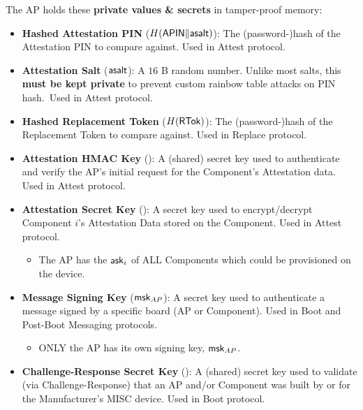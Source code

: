 \iflong
The AP holds these \textbf{private values \& secrets} in tamper-proof memory:
\begin{itemize}
    \item \textbf{Hashed Attestation PIN} ($H(\mathsf{APIN} \Vert \mathsf{asalt})$): The (password-)hash of the Attestation PIN to compare against. Used in Attest protocol.
    \item \textbf{Attestation Salt} ($\mathsf{asalt}$): A $16$ B random number. \iflong Unlike most salts, this \textbf{must be kept private} to prevent custom rainbow table attacks on PIN hash.~\fi Used in Attest protocol.
    \item \textbf{Hashed Replacement Token} ($H(\mathsf{RTok})$): The (password-)hash of the Replacement Token to compare against. Used in Replace protocol.
    \item \textbf{Attestation HMAC Key} (\hsk): A (shared) secret key used to authenticate and verify the AP's initial request for the Component's Attestation data. Used in Attest protocol.
    \item \textbf{Attestation Secret Key} (\ask): A secret key used to encrypt/decrypt Component $i$'s Attestation Data stored on the Component. Used in Attest protocol.
    \iflong
    \begin{itemize}
        \item  The AP has the $\mathsf{ask}_i$ of ALL Components which could be provisioned on the device.
    \end{itemize}
    \fi
    \item \textbf{Message Signing Key} ($\mathsf{msk}_{AP}$): A secret key used to authenticate a message signed by a specific board (AP or Component). Used in Boot and Post-Boot Messaging protocols.
    \iflong
    \begin{itemize}
        \item ONLY the AP has its own signing key, $\mathsf{msk}_{AP}$.
    \end{itemize}
    \fi
    \item \textbf{Challenge-Response Secret Key} (\csk): A (shared) secret key used to validate (via Challenge-Response) that an AP and/or Component was built by or for the Manufacturer's MISC device. Used in Boot protocol.
\end{itemize}

